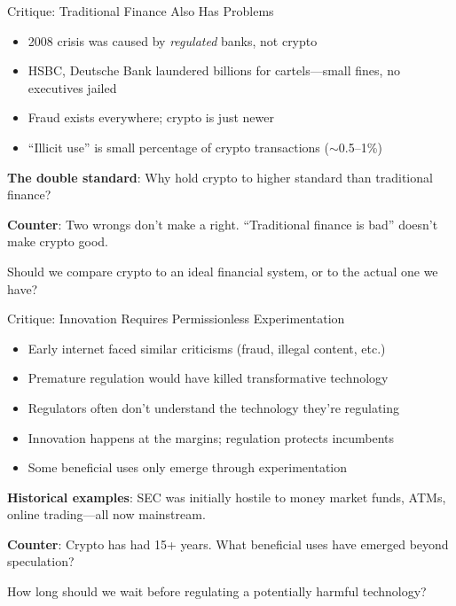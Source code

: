 ﻿\documentclass[aspectratio=169,11pt]{beamer}
\begin{document}
\begin{frame}[shrink=8]{Critique: Traditional Finance Also Has Problems}
\begin{objectionbox}
\small
\begin{itemize}
    \item 2008 crisis was caused by \emph{regulated} banks, not crypto
    \item HSBC, Deutsche Bank laundered billions for cartels---small fines, no executives jailed
    \item Fraud exists everywhere; crypto is just newer
    \item ``Illicit use'' is small percentage of crypto transactions ($\sim$0.5--1\%)
\end{itemize}
\end{objectionbox}

\vspace{0.2em}
\textbf{The double standard}: Why hold crypto to higher standard than traditional finance?

\textbf{Counter}: Two wrongs don't make a right. ``Traditional finance is bad'' doesn't make crypto good.

\begin{discussionbox}[Discussion]
Should we compare crypto to an ideal financial system, or to the actual one we have?
\end{discussionbox}
\end{frame}

\begin{frame}{Critique: Innovation Requires Permissionless Experimentation}
\begin{objectionbox}
\begin{itemize}
    \item Early internet faced similar criticisms (fraud, illegal content, etc.)
    \item Premature regulation would have killed transformative technology
    \item Regulators often don't understand the technology they're regulating
    \item Innovation happens at the margins; regulation protects incumbents
    \item Some beneficial uses only emerge through experimentation
\end{itemize}
\end{objectionbox}

\vspace{0.3em}
\textbf{Historical examples}: SEC was initially hostile to money market funds, ATMs, online trading---all now mainstream.

\textbf{Counter}: Crypto has had 15+ years. What beneficial uses have emerged beyond speculation?

\begin{discussionbox}[Discussion]
How long should we wait before regulating a potentially harmful technology?
\end{discussionbox}
\end{frame}
\end{document}
